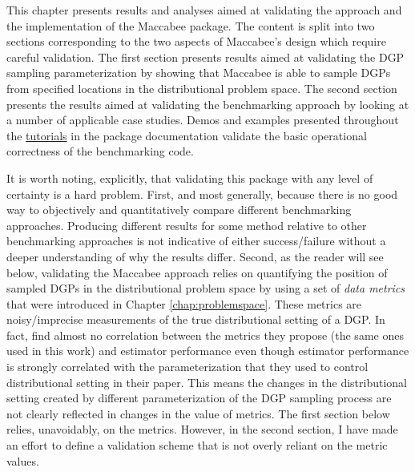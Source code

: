 \documentclass[../main.tex]{subfiles}
\begin{document}

\vspace{\baselineskip}

This chapter presents results and analyses aimed at validating the approach and the implementation of the Maccabee package. The content is split into two sections corresponding to the two aspects of Maccabee's design which require careful validation. The first section presents results aimed at validating the DGP sampling parameterization by showing that Maccabee is able to sample DGPs from specified locations in the distributional problem space. The second section presents the results aimed at validating the benchmarking approach by looking at a number of applicable case studies. Demos and examples presented throughout the \href{\RTDurl/usage.html}{tutorials} in the package documentation validate the basic operational correctness of the benchmarking code.

\vspace{\baselineskip}

It is worth noting, explicitly, that validating this package with any level of certainty is a hard problem. First, and most generally, because there is no good way to objectively and quantitatively compare different benchmarking approaches. Producing different results for some method relative to other benchmarking approaches is not indicative of either success/failure without a deeper understanding of why the results differ. Second, as the reader will see below, validating the Maccabee approach relies on quantifying the position of sampled DGPs in the distributional problem space by using a set of \textit{data metrics} that were introduced in Chapter \ref{chap:problemspace}. These metrics are noisy/imprecise measurements of the true distributional setting of a DGP. In fact, \textcite{Dorie2019Automated1} find almost no correlation between the metrics they propose (the same ones used in this work) and estimator performance even though estimator performance is strongly correlated with the parameterization that they used to control distributional setting in their paper. This means the changes in the distributional setting created by different parameterization of the DGP sampling process are not clearly reflected in changes in the value of metrics. The first section below relies, unavoidably, on the metrics. However, in the second section, I have made an effort to define a validation scheme that is not overly reliant on the metric values.
\end{document}
